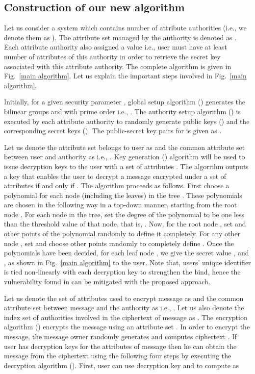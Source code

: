 \documentclass[10pt,journal]{IEEEtran}
\begin{document}
\subsection{Construction of our new algorithm}
Let us consider a system which contains  number of attribute authorities (i.e., we denote them as ). The attribute set managed by the authority  is denoted as   . Each attribute authority also assigned a value  i.e., user must have at least  number of attributes of this authority in order to retrieve the secret key associated with this attribute authority. The complete algorithm is given in Fig.~\ref{main algorithm}. Let us explain the important steps involved in Fig.~\ref{main algorithm}.

Initially, for a given security parameter , global setup algorithm () generates the bilinear groups  and  with prime order  i.e., . The authority setup algorithm () is executed by each attribute authority to randomly generate public keys () and the corresponding secret keys ().  The public-secret key pairs for  is given as .

Let us denote the attribute set belongs to user  as  and the common attribute set between user  and authority   as  i.e., . Key generation () algorithm will be used to issue decryption keys to the user  with a set of attributes . The algorithm outputs a key that enables the user to decrypt a message encrypted under a set of attributes  if and only if .  The algorithm proceeds as follows. First choose a polynomial  for each node  (including the leaves)
in the tree . These polynomials are chosen in the following way in a top-down manner,
starting from the root node . For each node  in the tree, set the degree  of the polynomial  to be one less than
the threshold value  of that node, that is, . Now, for the root node , set
 and  other points of the polynomial  randomly to define it completely. For
any other node , set  and choose  other points randomly to
completely define . Once the polynomials have been decided, for each leaf node , we give the
secret value  ,  and ,  as shown in Fig.~\ref{main algorithm} to the user.
Note that, users' unique identifier  is tied non-linearly with each decryption key to strengthen the bind, hence the vulnerability found in \cite{main1} can be mitigated with the proposed approach. 



Let us denote the set of attributes used to encrypt  message  as  and the common attribute set between message  and the authority  as  i.e., . Let us also denote the index set of authorities involved in the ciphertext of message  as . The encryption algorithm ()  encrypts the message  using an attribute set . In order to encrypt the message, the message owner randomly generates  and computes ciphertext . If user has decryption keys for the attributes of message  then he can obtain the message  from the ciphertext using the following four steps by executing the decryption algorithm (). First, user can use decryption key  and  to compute  as
\end{document}
